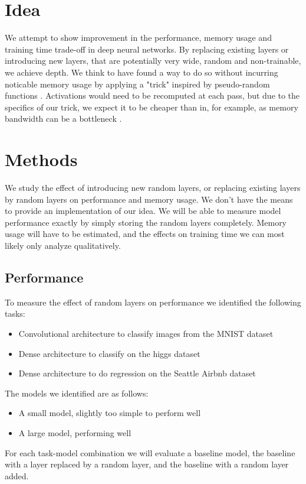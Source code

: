 \documentclass[]{article}
\begin{document}
\begin{multicols}{2}
	\section{Idea}
	We attempt to show improvement in the performance, memory usage and training time trade-off in deep neural networks. By replacing existing layers or introducing new layers, that are potentially very wide, random and non-trainable, we achieve depth. We think to have found a way to do so without incurring noticable memory usage by applying a "trick" inspired by pseudo-random functions \cite{Goldreich_Goldwasser_Micali_1986}. Activations would need to be recomputed at each pass, but due to the specifics of our trick, we expect it to be cheaper than in, for example, \cite{DBLP:journals/corr/GruslysMDLG16} as memory bandwidth can be a bottleneck \cite{Li_Shen_Dou_Ni_Xu_Yang_Wang_Niu_2019}.
	
	\section{Methods}
	We study the effect of introducing new random layers, or replacing existing layers by random layers on performance and memory usage. We don't have the means to provide an implementation of our idea. We will be able to measure model performance exactly by simply storing the random layers completely. Memory usage will have to be estimated, and the effects on training time we can most likely only analyze qualitatively.
	
	\subsection{Performance}
	To measure the effect of random layers on performance we identified the following tasks:
	\begin{itemize}
		\itemsep0em
		\item Convolutional architecture to classify images from the MNIST dataset
		\item Dense architecture to classify on the higgs dataset
		\item Dense architecture to do regression on the Seattle Airbnb dataset
	\end{itemize}
	The models we identified are as follows:
	\begin{itemize}
		\itemsep0em
		\item A small model, slightly too simple to perform well
		\item A large model, performing well
	\end{itemize}
	For each task-model combination we will evaluate a baseline model, the baseline with a layer replaced by a random layer, and the baseline with a random layer added.
	

\end{multicols}
\end{document}
